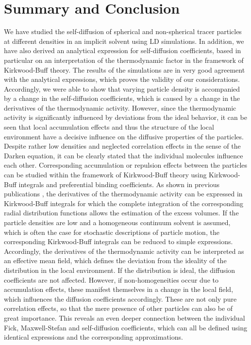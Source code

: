 \documentclass[aip,jcp,reprint]{revtex4-1}
\begin{document}
\section{Summary and Conclusion}
We have studied the self-diffusion of spherical and non-spherical tracer particles at different densities in an implicit solvent using LD simulations. In addition, we have also derived an analytical expression for self-diffusion coefficients, based in particular on an interpretation of the thermodynamic factor in the framework of Kirkwood-Buff theory. The results of the simulations are in very good agreement with the analytical expressions, which proves the validity of our considerations. Accordingly, we were able to show that varying particle density is accompanied by a change in the self-diffusion coefficients, which is caused by a change in the derivatives of the thermodynamic activity. However, since the thermodynamic activity is significantly influenced by deviations from the ideal behavior, it can be seen that local accumulation effects and thus the structure of the local environment have a decisive influence on the diffusive properties of the particles. \\
Despite rather low densities and neglected correlation effects in the sense of the Darken equation, it can be clearly stated that the individual molecules influence each other. 
Corresponding accumulation or repulsion effects between the particles can be studied within the framework of Kirkwood-Buff theory \cite{kirkwood51} using Kirkwood-Buff integrals and preferential binding coefficients. As shown in previous publications \cite{ben13a,smith06,smiatek17a}, the derivatives of the thermodynamic activity can be expressed in Kirkwood-Buff integrals for which the complete integration of the corresponding radial distribution functions allows the estimation of the excess volumes. If the particle densities are low and a homogeneous continuum solvent is assumed, which is often the case for stochastic descriptions of particle motion, the corresponding Kirkwood-Buff integrals can be reduced to simple expressions. \\
Accordingly, the derivatives of the thermodynamic activity can be interpreted as an effective mean field, which defines the deviation from the ideality of the distribution in the local environment. If the distribution is ideal, the diffusion coefficients are  not affected. However, if non-homogeneities occur due to accumulation effects, these manifest themselves in a change in the local field, which influences the diffusion coefficients accordingly.  These are not only pure correlation effects, so that the mere presence of other particles can also be of great importance. This reveals an even deeper connection between the individual Fick, Maxwell-Stefan and self-diffusion coefficients, which can all be defined using identical expressions and the corresponding approximations. \\
\end{document}
